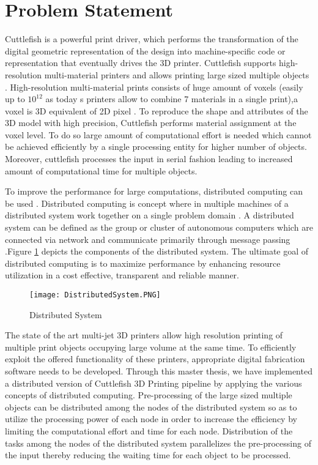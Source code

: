 \section{Problem Statement}

Cuttlefish \cite{cuttlefish} is a powerful print driver, which performs the transformation of the digital geometric representation of the design into machine-specific code or representation that eventually drives the 3D printer. Cuttlefish supports high-resolution multi-material printers and allows printing large sized multiple objects . High-resolution multi-material prints consists of huge amount of voxels (easily up to \begin{math}10^{12}\end{math} as today \textquotesingle s printers allow to combine 7 materials in a single print),a voxel is 3D equivalent of 2D pixel \cite{3DString}. To reproduce the shape and attributes of the 3D model with high precision, Cuttlefish performs material assignment at the voxel level. To do so large amount of computational effort is needed which cannot be achieved efficiently by a single processing entity for higher number of objects.  Moreover, cuttlefish processes the input in serial fashion leading to increased amount of computational time for multiple objects. \newline

To improve the performance for large computations, distributed computing can be used \cite{DistComp} \cite{Desai}.  Distributed computing is concept where in multiple machines of a distributed system work together on a single problem domain \cite{rouse}.  A distributed system can be defined as the group or cluster of autonomous computers which are connected via network and communicate primarily through message passing \cite{coulouris}.Figure \ref{fig:DistributedSystem} depicts the components of the distributed system. The ultimate goal of distributed computing is to maximize performance by enhancing resource utilization in a cost effective, transparent and reliable manner.\newline

\begin{figure}[ht!]
\centering
\texttt{[image: DistributedSystem.PNG]}
\caption{Distributed System}
\label{fig:DistributedSystem}
\end{figure}

The state of the art multi-jet 3D printers allow high resolution printing of multiple print objects occupying large volume at the same time. To efficiently exploit the offered functionality of these printers, appropriate digital fabrication software needs to be developed. Through this master thesis, we have implemented a distributed version of Cuttlefish 3D Printing pipeline by applying the various concepts of distributed computing. Pre-processing of the large sized multiple objects can be distributed among the nodes of the distributed system so as to utilize the processing power of each node in order to increase the efficiency by limiting the computational effort and time for each node. Distribution of the tasks among the nodes of the distributed system parallelizes the pre-processing of the input thereby reducing the waiting time for each object to be processed. 

